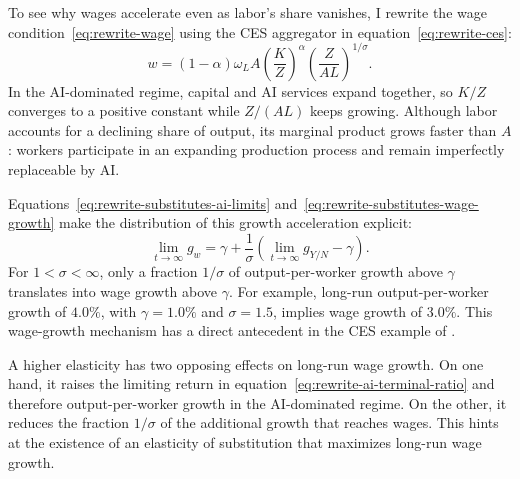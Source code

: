 To see why wages accelerate even as labor's share vanishes, I rewrite the wage condition~\eqref{eq:rewrite-wage} using the CES aggregator in equation~\eqref{eq:rewrite-ces}:
\begin{equation}
 w=(1-\alpha)\omega_L A
 \left(\frac KZ\right)^\alpha
 \left(\frac Z{AL}\right)^{1/\sigma}.
 \label{eq:rewrite-wage-scale}
\end{equation}
In the AI-dominated regime, capital and AI services expand together, so $K/Z$ converges to a positive constant while $Z/(AL)$ keeps growing.
Although labor accounts for a declining share of output, its marginal product grows faster than $A$: workers participate in an expanding production process and remain imperfectly replaceable by AI.

Equations~\eqref{eq:rewrite-substitutes-ai-limits}
and~\eqref{eq:rewrite-substitutes-wage-growth} make the distribution of
this growth acceleration explicit:
\begin{equation}
 \lim_{t\to\infty}g_w
 =\gamma+ \frac{1}{\sigma}
 \left(\lim_{t\to\infty}g_{Y/N}-\gamma\right).
 \label{eq:rewrite-wage-growth-premium}
\end{equation}
For $1<\sigma<\infty$, only a fraction $1/\sigma$ of output-per-worker growth above $\gamma$ translates into wage growth above $\gamma$. %
For example, long-run output-per-worker growth of $4.0\%$, with $\gamma=1.0\%$ and $\sigma=1.5$, implies wage growth of $3.0\%$.
This wage-growth mechanism has a direct antecedent in the CES example of \citet{palivoskaragiannis2010}.


A higher elasticity has two opposing effects on long-run wage growth. On one hand, it raises the limiting return in equation~\eqref{eq:rewrite-ai-terminal-ratio} and therefore output-per-worker growth in the AI-dominated regime. On the other, it reduces the fraction $1/\sigma$ of the additional growth that reaches wages. This hints at the existence of an elasticity of substitution that maximizes long-run wage growth.

